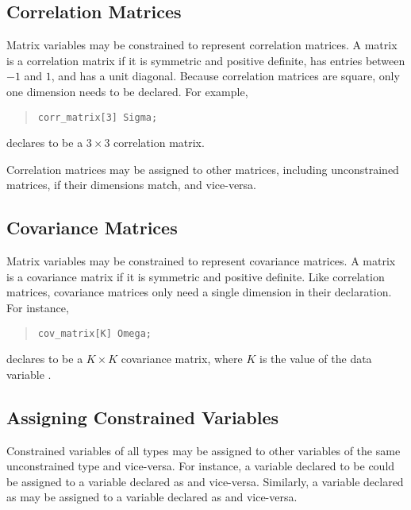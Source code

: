 \subsection{Correlation Matrices}

Matrix variables may be constrained to represent correlation matrices.
A matrix is a correlation matrix if it is symmetric and positive
definite, has entries between $-1$ and $1$, and has a unit diagonal.
Because correlation matrices are square, only one dimension needs
to be declared.  For example,
%
\begin{quote}
\begin{Verbatim} 
corr_matrix[3] Sigma;
\end{Verbatim}
\end{quote}
% 
declares  to be a $3 \times 3$ correlation matrix.

Correlation matrices may be assigned to other matrices, including
unconstrained matrices, if their dimensions match, and vice-versa.

\subsection{Covariance Matrices}

Matrix variables may be constrained to represent covariance matrices.
A matrix is a covariance matrix if it is symmetric and positive
definite.  Like correlation matrices, covariance matrices only need a
single dimension in their declaration.  For instance,
%
\begin{quote}
\begin{Verbatim} 
cov_matrix[K] Omega;
\end{Verbatim}
\end{quote}
% 
declares  to be a $K \times K$ covariance matrix, where
$K$ is the value of the data variable .  

\subsection{Assigning Constrained Variables}

Constrained variables of all types may be assigned to other variables
of the same unconstrained type and vice-versa.  For instance, a
variable declared to be  could be assigned to a
variable declared as  and vice-versa.  Similarly,
a variable declared as  may be assigned to a
variable declared as  and vice-versa.  


